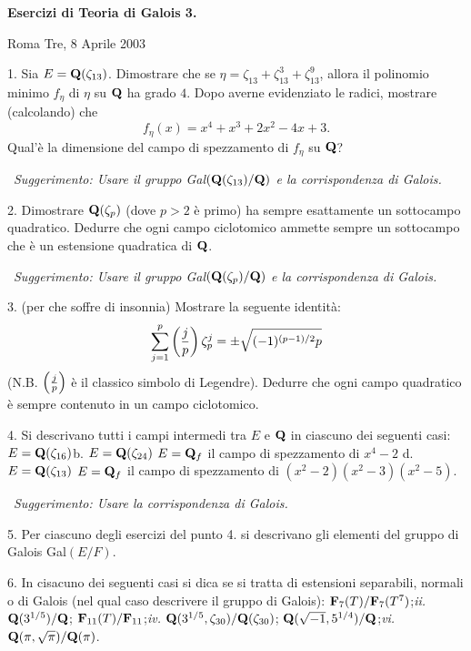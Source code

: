  \nopagenumbers
\def\frac#1#2{{#1\over#2}}
\def\Q{{\bf Q}}
\def\Z{{\bf Z}}
\def\N{{\bf N}}
\def\C{{\bf C}}
\def\F{{\bf F}}
\def\QQ{{\rm Q}}


\centerline{{\bf Esercizi di Teoria di Galois 3.}}\medskip

\centerline{Roma Tre, 8 Aprile 2003}\bigskip

\item{1.} Sia $E=\Q(\zeta_{13})$. Dimostrare che se $\eta=\zeta_{13}+
\zeta_{13}^3+\zeta_{13}^9$, allora il polinomio minimo $f_\eta$ di
$\eta$ su $\Q$ ha grado $4$. Dopo averne evidenziato le radici, mostrare (calcolando)
che
$$f_\eta(x)=x^4+x^3+2x^2-4x+3.$$
Qual'\`{e} la dimensione del campo di spezzamento di $f_\eta$ su $\Q$?

\  \hfill {\it Suggerimento: Usare il gruppo {\rm Gal}$(\Q(\zeta_{13})/\Q)$ e la corrispondenza
di Galois.}
\bigskip

\item{2.} Dimostrare $\Q(\zeta_p)$ (dove $p>2$ \`{e} primo) ha sempre esattamente un sottocampo
quadratico. Dedurre che ogni campo ciclotomico ammette sempre un sottocampo che \`{e}
un estensione quadratica di $\Q$.

\  \hfill {\it Suggerimento: Usare il gruppo {\rm Gal}$(\Q(\zeta_{p})/\Q)$ e la corrispondenza
di Galois.}
\bigskip

\item{3.} (per che soffre di insonnia) Mostrare la seguente identit\`{a}:
$$\sum_{j=1}^p\left({j\over p}\right)\zeta_{p}^j=\pm\sqrt{(-1)^{(p-1)/2}p}$$
(N.B. $\left({j\over p}\right)$ \`{e} il classico simbolo di Legendre).
Dedurre che ogni campo quadratico \`{e} sempre contenuto in un campo ciclotomico.
\bigskip

\item{4.} Si descrivano tutti i campi intermedi tra $E$ e $\Q$ in
ciascuno dei seguenti casi:
 $E=\Q(\zeta_{16})$\hfill {b.} $E=\Q(\zeta_{24})$
 $E=\Q_f$ il campo di spezzamento di $x^4-2$\hfill
{d.} $E=\Q(\zeta_{13})$
 $E=\Q_f$ il campo di spezzamento di $(x^2-2)(x^2-3)(x^2-5)$.

\  \hfill {\it Suggerimento: Usare la corrispondenza di Galois.}
\bigskip

\item{5.} Per ciascuno degli esercizi del punto 4. si descrivano gli
elementi del gruppo di Galois Gal$(E/F)$.
\bigskip

\item{6.} In cisacuno dei seguenti casi si dica se si tratta di estensioni separabili,
normali o di Galois (nel qual caso descrivere il gruppo di Galois):
 $\F_7(T)/\F_7(T^7)$;\hfill {\it ii.} $\Q(3^{1/5})/\Q$;
 $\F_{11}(T)/\F_{11}$;\hfill {\it iv.} $\Q(3^{1/5},\zeta_{30})/\Q(\zeta_{30})$;
 $\Q(\sqrt{-1},5^{1/4})/\Q$;\hfill {\it vi.} $\Q(\pi,\sqrt{\pi})/\Q(\pi)$.
\bigskip

